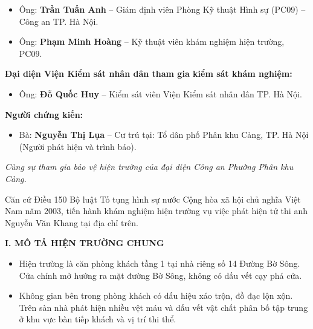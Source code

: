 \documentclass[12pt,a4paper]{article}
\begin{document}
\begin{itemize}[leftmargin=*, itemsep=2pt, topsep=2pt, parsep=0pt]
  \item Ông: \textbf{Trần Tuấn Anh} – Giám định viên Phòng Kỹ thuật Hình sự (PC09) – Công an TP. Hà Nội.
  \item Ông: \textbf{Phạm Minh Hoàng} – Kỹ thuật viên khám nghiệm hiện trường, PC09.

\end{itemize}
\textbf{Đại diện Viện Kiểm sát nhân dân tham gia kiểm sát khám nghiệm:}

\begin{itemize}[leftmargin=*, itemsep=2pt, topsep=2pt, parsep=0pt]
  \item Ông: \textbf{Đỗ Quốc Huy} – Kiểm sát viên Viện Kiểm sát nhân dân TP. Hà Nội.

\end{itemize}
\textbf{Người chứng kiến:}

\begin{itemize}[leftmargin=*, itemsep=2pt, topsep=2pt, parsep=0pt]
  \item Bà: \textbf{Nguyễn Thị Lụa} – Cư trú tại: Tổ dân phố Phân khu Cảng, TP. Hà Nội (Người phát hiện và trình báo).

\end{itemize}
\textit{Cùng sự tham gia bảo vệ hiện trường của đại diện Công an Phường Phân khu Cảng.}



Căn cứ Điều 150 Bộ luật Tố tụng hình sự nước Cộng hòa xã hội chủ nghĩa Việt Nam năm 2003, tiến hành khám nghiệm hiện trường vụ việc phát hiện tử thi anh Nguyễn Văn Khang tại địa chỉ trên.




\vspace{0.3cm}\noindent\textbf{\large I. MÔ TẢ HIỆN TRƯỜNG CHUNG}\\[0.15cm]


\begin{itemize}[leftmargin=*, itemsep=2pt, topsep=2pt, parsep=0pt]
  \item Hiện trường là căn phòng khách tầng 1 tại nhà riêng số 14 Đường Bờ Sông. Cửa chính mở hướng ra mặt đường Bờ Sông, không có dấu vết cạy phá cửa.
  \item Không gian bên trong phòng khách có dấu hiệu xáo trộn, đồ đạc lộn xộn. Trên sàn nhà phát hiện nhiều vệt máu và dấu vết vật chất phân bố tập trung ở khu vực bàn tiếp khách và vị trí thi thể.


\end{itemize}
\end{document}
